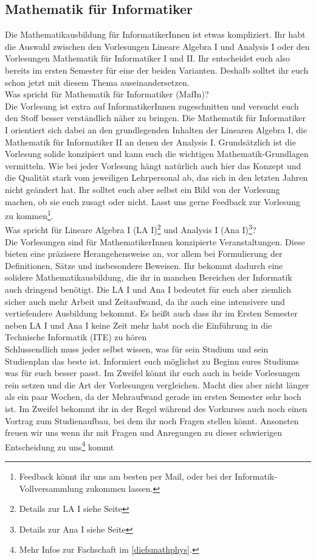 \subsection{Mathematik für Informatiker}
\label{mafin}

Die Mathematikausbildung für InformatikerInnen ist etwas kompliziert. Ihr habt die Auswahl zwischen den Vorlesungen Lineare Algebra I und Analysis I oder den Vorlesungen Mathematik für Informatiker I und II. Ihr entscheidet euch also bereits im ersten Semester für eine der beiden Varianten. Deshalb solltet ihr euch schon jetzt mit diesem Thema auseinandersetzen.\\

Was spricht für Mathematik für Informatiker (MafIn)?\\
Die Vorlesung ist extra auf InformatikerInnen zugeschnitten und versucht euch den Stoff besser verständlich näher zu bringen. Die Mathematik für Informatiker I orientiert sich dabei an den grundlegenden Inhalten der Linearen Algebra I, die Mathematik für Informatiker II an denen der Analysis I. Grundsätzlich ist die Vorlesung solide konzipiert und kann euch die wichtigen Mathematik-Grundlagen vermitteln. Wie bei jeder Vorlesung hängt natürlich auch hier das Konzept und die Qualität stark vom jeweiligen Lehrpersonal ab, das sich in den letzten Jahren nicht geändert hat. Ihr solltet euch aber selbst ein Bild von der Vorlesung machen, ob sie euch zusagt oder nicht. Lasst uns gerne Feedback zur Vorlesung zu kommen\footnote{Feedback könnt ihr uns am besten per Mail, oder bei der Informatik-Vollversammlung zukommen lassen.}.\\

Was spricht für Lineare Algebra I (LA I)\footnote{Details zur LA I siehe Seite \pageref{la1}} und Analysis I (Ana I)\footnote{Details zur Ana I siehe Seite \pageref{ana1}}?\\
Die Vorlesungen sind für MathematikerInnen konzipierte Veranstaltungen. Diese bieten eine präzisere Herangehensweise an, vor allem bei Formulierung der Definitionen, Sätze und insbesondere Beweisen. Ihr bekommt dadurch eine solidere Mathematikausbildung, die ihr in manchen Bereichen der Informatik auch dringend benötigt. Die LA I und Ana I bedeutet für euch aber ziemlich sicher auch mehr Arbeit und Zeitaufwand, da ihr auch eine intensivere und vertiefendere Ausbildung bekommt. Es heißt auch dass ihr im Ersten Semester neben LA I und Ana I keine Zeit mehr habt noch die Einführung in die Technische Informatik (ITE) zu hören\\

Schlussendlich muss jeder selbst wissen, was für sein Studium und sein Studienplan das beste ist. Informiert euch möglichst zu Beginn eures Studiums was für euch besser passt. Im Zweifel könnt ihr euch auch in beide Vorlesungen rein setzen und die Art der Vorlesungen vergleichen. Macht dies aber nicht länger als ein paar Wochen, da der Mehraufwand gerade im ersten Semester sehr hoch ist. Im Zweifel bekommt ihr in der Regel während des Vorkurses auch noch einen Vortrag zum Studienaufbau, bei dem ihr noch Fragen stellen könnt. Ansonsten freuen wir uns wenn ihr mit Fragen und Anregungen zu dieser schwierigen Entscheidung zu uns\footnote{Mehr Infos zur Fachschaft im \autoref{diefsmathphys}.} kommt
